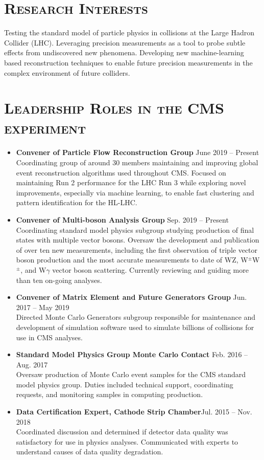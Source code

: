 \documentclass[10pt]{res} %
\begin{document}
\begin{resume}
\section{\textsc{Research Interests}}
Testing the standard model of particle physics in collisions at the Large Hadron Collider (LHC). 
Leveraging precision measurements as a tool to probe subtle effects from undiscovered new phenomena. 
Developing new machine-learning based reconstruction techniques to enable future precision measurements in the 
complex environment of future colliders.

\section{\textsc{Leadership Roles in the CMS experiment}}
\begin{itemize}
\item{\textbf{Convener of Particle Flow Reconstruction Group} \hfill{June 2019 -- Present}} \\
    Coordinating group of around 30 members maintaining and improving global event reconstruction algorithms
    used throughout CMS. Focused on maintaining Run 2 performance for the LHC Run 3 while exploring
    novel improvements, especially via machine learning, to enable fast clustering and pattern identification
    for the HL-LHC.
\item{\textbf{Convener of Multi-boson Analysis Group} \hfill{Sep. 2019 -- Present}} \\
    Coordinating standard model physics subgroup studying production of final states
    with multiple vector bosons. Oversaw the development and publication of over ten new measurements, 
    including the first observation of triple vector boson production and the most accurate measurements 
    to date of WZ, W$^{\pm}$W$^{\pm}$, and W$\gamma$ vector boson scattering. Currently reviewing and guiding
    more than ten on-going analyses.
\item{\textbf{Convener of Matrix Element and Future Generators Group} \hfill{Jun. 2017 -- May 2019}}\\
    Directed Monte Carlo Generators subgroup 
    responsible for maintenance and development of simulation software used to simulate
    billions of collisions for use in CMS analyses.
\item{\textbf{Standard Model Physics Group Monte Carlo Contact} \hfill{Feb. 2016 -- Aug. 2017}} \\
    Oversaw
    production of Monte Carlo event samples for the CMS standard model physics group. 
    Duties included technical support, coordinating requests, and monitoring samples in computing production.
\item{\textbf{ Data Certification Expert, Cathode Strip Chamber}\hfill{Jul. 2015 -- Nov. 2018}} \\
    Coordinated discussion and determined if
    detector data quality was satisfactory for use in physics analyses.
    Communicated with experts to understand
    causes of data quality degradation.
\end{itemize}


\end{resume}
\end{document}
